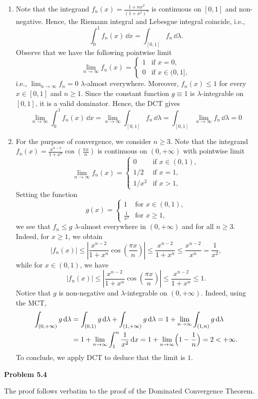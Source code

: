 \begin{enumerate}[label={(\alph*)}]
	\item Note that the integrand $f_n(x)=\frac{1+n x^2}{(1+x^2)^n}$ is continuous on $[0, 1]$ and non-negative. Hence, the Riemann integral and Lebesgue integral coincide, i.e.,
	\[
		\int_0^1 f_n(x)\,\dd x = \int_{[0,1]} f_n\,\dd\lambda.
	\] 
	Observe that we have the following pointwise limit
	\[
		\lim_{n\to\infty} f_n(x) = \begin{cases}
			1 &\text{if  $x=0$}, \\
			0 &\text{if $x\in (0,1]$},
		\end{cases}
	\]
	i.e., $\lim_{n\to\infty} f_n = 0$ $\lambda$-almost everywhere. Moreover, $f_n(x) \le 1$ for every $x\in[0,1]$ and $n\ge 1$. Since the constant function $g\equiv 1$ is $\lambda$-integrable on $[0,1]$, it is a valid dominator. Hence, the DCT gives
	\[
		\lim_{n\to\infty} \int_0^1 f_n(x)\,\dd x = \lim_{n\to\infty} \int_{[0,1]} f_n\,\dd \lambda = \int_{[0,1]} \lim_{n\to\infty} f_n\,\dd\lambda = 0
	\]
	
	\item For the purpose of convergence, we consider $n\ge 3$. Note that the integrand $f_n(x)=\frac{x^{n-2}}{1+x^n}\cos\left(\frac{\pi x}{n}\right)$ is continuous on $(0, +\infty)$ with pointwise limit
	\[
		\lim_{n\to\infty} f_n(x) = \begin{cases}
			0 & \text{if $x\in(0,1)$}, \\
			1/2 & \text{if $x=1$}, \\
			1/x^2 & \text{if $x>1$},
		\end{cases}
	\]
	Setting the function
	\[
		g(x) = \begin{cases}
			1 &\text{for $x\in(0,1)$},\\
			\frac{1}{x^2} &\text{for $x\ge 1$},
		\end{cases}
	\]
	we see that $f_n\le g$ $\lambda$-almost everywhere in $(0,+\infty)$ and for all $n\ge 3$. Indeed, for $x\ge 1$, we obtain
	\[
		|f_n(x)| \le \left| \frac{x^{n-2}}{1+x^n}\cos\left(\frac{\pi x}{n}\right)\right| \le \frac{x^{n-2}}{1+x^n} \le \frac{x^{n-2}}{x^n} =\frac{1}{x^2},
	\]
	while for $x\in(0,1)$, we have
	\[
		|f_n(x)| \le \left| \frac{x^{n-2}}{1+x^n}\cos\left(\frac{\pi x}{n}\right)\right| \le \frac{x^{n-2}}{1+x^n} \le 1.
	\]
	Notice that $g$ is non-negative and $\lambda$-integrable on $(0,+\infty)$. Indeed, using the MCT,
	\begin{align*}
		\int_{(0,+\infty)} g\,\mathrm{d}\lambda &= \int_{(0,1)} g\,\mathrm{d}\lambda + \int_{(1,+\infty)} g\,\mathrm{d}\lambda = 1 + \lim_{n\to\infty} \int_{(1,n)} g\,\mathrm{d}\lambda \\
		&= 1 + \lim_{n\to\infty} \int_1^n \frac{1}{x^2}\,\mathrm{d} x = 1 + \lim_{n\to\infty} \Bigl(1-\frac{1}{n} \Bigr) = 2 < +\infty.
	\end{align*}
	To conclude, we apply DCT to deduce that the limit is $1$.
\end{enumerate}



\bigskip
\textbf{Problem 5.4}

The proof follows verbatim to the proof of the Dominated Convergence Theorem.




